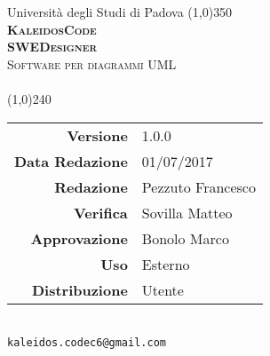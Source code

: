 \documentclass[a4paper,12pt]{article}
\author{KaleidosCode}
\date{01/07/2017}	%
\begin{document}
	\begin{titlepage}		
		\centering Università degli Studi di Padova
		\line(1,0){350}\\
		\vspace{0.4cm}
		{\bfseries\scshape\LARGE KaleidosCode\\}
		\vspace{0.4cm}
		{\bfseries\scshape\LARGE SWEDesigner\\}
		{\scshape\Large Software per diagrammi UML\\}
		\vspace{1cm}
		{\scshape\Large \manualeutentei\ \\}		%
		\vspace{1.4cm}
		\logo
		\vspace{1.2cm}
		\line(1,0){240}\\
		\begin{tabular}{r|l}
			{\hfill \textbf{Versione}} 			& 1.0.0\\
			{\hfill \textbf{Data Redazione}} 	& 01/07/2017\\	%
			{\hfill \textbf{Redazione}} 		& Pezzuto Francesco\\
			{\hfill \textbf{Verifica}} 			& Sovilla Matteo\\
			{\hfill \textbf{Approvazione}} 		& Bonolo Marco\\
			{\hfill \textbf{Uso}} 				& Esterno\\
			{\hfill \textbf{Distribuzione}} 	& Utente\\
		\end{tabular}\\
		\vspace{2cm}
		\texttt{kaleidos.codec6@gmail.com}
	\end{titlepage}

	\pagestyle{myfront}
	\newpage
		
	\newpage
		\tableofcontents
	\newpage
		\listoffigures
	\newpage
	\pagestyle{mymain}
		
	\newpage
		
	\newpage
		
	\newpage
		
	\appendix
	\newpage
		
	\label{LastPage}
\end{document}
